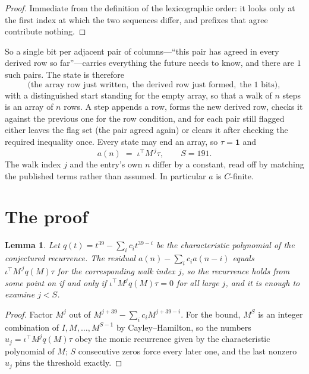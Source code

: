 \documentclass[11pt,a4paper]{article}
\theoremstyle{plain}
\newtheorem{lemma}[theorem]{Lemma}
\theoremstyle{definition}
\begin{document}
\begin{proof}
Immediate from the definition of the lexicographic order: it looks only at the first index at
which the two sequences differ, and prefixes that agree contribute nothing.
\end{proof}

So a single bit per adjacent pair of columns---``this pair has agreed in every derived row so
far''---carries everything the future needs to know, and there are $1$ such pairs. The state
is therefore
\[
\bigl(\text{the array row just written},\; \text{the derived row just formed},\;
\text{the 1 bits}\bigr),
\]
with a distinguished start standing for the empty array, so that a walk of $n$ steps is an array
of $n$ rows. A step appends a row, forms the new derived row, checks it against the previous one
for the row condition, and for each pair still flagged either leaves the flag set (the pair
agreed again) or clears it after checking the required inequality once. Every state may end an
array, so $\tau=\mathbf{1}$ and
\[
a(n)\;=\;\iota^{\!\top}M^{\,j}\tau ,\qquad S=191.
\]
The walk index $j$ and the entry's own $n$ differ by a constant, read off by matching the
published terms rather than assumed. In particular $a$ is $C$-finite.

\section{The proof}

\begin{lemma}\label{lem:crit}
Let $q(t)=t^{39}-\sum_i c_it^{39-i}$ be the characteristic polynomial of the
conjectured recurrence. The residual $a(n)-\sum_ic_ia(n-i)$ equals
$\iota^{\!\top}M^{\,j}q(M)\tau$ for the corresponding walk index $j$, so the recurrence
holds from some point on if and only if $\iota^{\!\top}M^{j}q(M)\tau=0$ for all large $j$,
and it is enough to examine $j<S$.
\end{lemma}

\begin{proof}
Factor $M^{j}$ out of $M^{j+39}-\sum_ic_iM^{j+39-i}$. For the bound, $M^{S}$
is an integer combination of $I,M,\dots,M^{S-1}$ by Cayley--Hamilton, so the numbers
$u_j=\iota^{\!\top}M^{j}q(M)\tau$ obey the monic recurrence given by the characteristic
polynomial of $M$; $S$ consecutive zeros force every later one, and the last nonzero $u_j$
pins the threshold exactly.
\end{proof}
\end{document}
